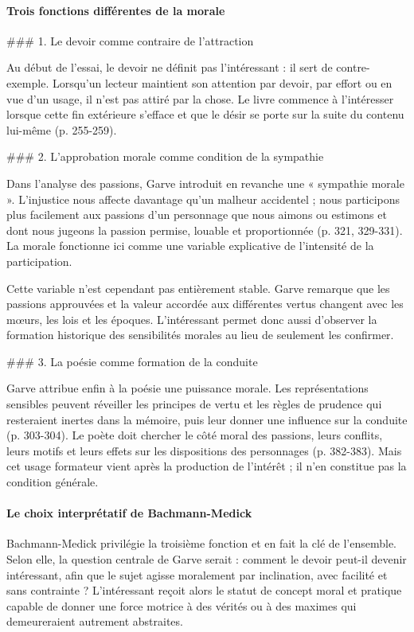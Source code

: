 \documentclass[10pt,a4paper]{article}
\begin{document}
\paragraph{Trois fonctions différentes de la morale}
\#\#\# 1. Le devoir comme contraire de l'attraction

Au début de l'essai, le devoir ne définit pas l'intéressant : il sert de contre-exemple. Lorsqu'un lecteur maintient son attention par devoir, par effort ou en vue d'un usage, il n'est pas attiré par la chose. Le livre commence à l'intéresser lorsque cette fin extérieure s'efface et que le désir se porte sur la suite du contenu lui-même (p. 255-259).

\#\#\# 2. L'approbation morale comme condition de la sympathie

Dans l'analyse des passions, Garve introduit en revanche une « sympathie morale ». L'injustice nous affecte davantage qu'un malheur accidentel ; nous participons plus facilement aux passions d'un personnage que nous aimons ou estimons et dont nous jugeons la passion permise, louable et proportionnée (p. 321, 329-331). La morale fonctionne ici comme une variable explicative de l'intensité de la participation.

Cette variable n'est cependant pas entièrement stable. Garve remarque que les passions approuvées et la valeur accordée aux différentes vertus changent avec les mœurs, les lois et les époques. L'intéressant permet donc aussi d'observer la formation historique des sensibilités morales au lieu de seulement les confirmer.

\#\#\# 3. La poésie comme formation de la conduite

Garve attribue enfin à la poésie une puissance morale. Les représentations sensibles peuvent réveiller les principes de vertu et les règles de prudence qui resteraient inertes dans la mémoire, puis leur donner une influence sur la conduite (p. 303-304). Le poète doit chercher le côté moral des passions, leurs conflits, leurs motifs et leurs effets sur les dispositions des personnages (p. 382-383). Mais cet usage formateur vient après la production de l'intérêt ; il n'en constitue pas la condition générale.

\paragraph{Le choix interprétatif de Bachmann-Medick}
Bachmann-Medick privilégie la troisième fonction et en fait la clé de l'ensemble. Selon elle, la question centrale de Garve serait : comment le devoir peut-il devenir intéressant, afin que le sujet agisse moralement par inclination, avec facilité et sans contrainte ? L'intéressant reçoit alors le statut de concept moral et pratique capable de donner une force motrice à des vérités ou à des maximes qui demeureraient autrement abstraites.
\end{document}
